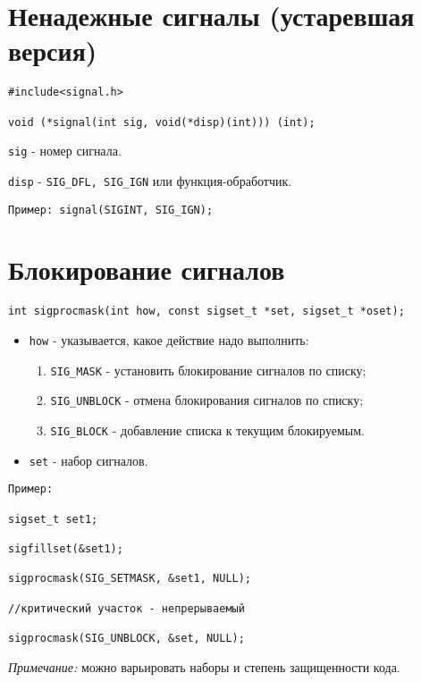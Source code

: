 \section{Ненадежные сигналы (устаревшая версия)}

\begin{verbatim}
#include<signal.h>

void (*signal(int sig, void(*disp)(int))) (int);
\end{verbatim}
\verb+sig+ - номер сигнала.

\verb+disp+ - \verb+SIG_DFL, SIG_IGN+ или функция-обработчик.

\verb+Пример: signal(SIGINT, SIG_IGN);+

\section{Блокирование сигналов}

\verb+int sigprocmask(int how, const sigset_t *set, sigset_t *oset);+
\begin{itemize}
\item \verb+how+ - указывается, какое действие надо выполнить:
	\begin{enumerate}
		\item \verb+SIG_MASK+ - установить блокирование сигналов по списку;
		\item \verb+SIG_UNBLOCK+ - отмена блокирования сигналов по списку;
		\item \verb+SIG_BLOCK+ - добавление списка к текущим блокируемым.
	\end{enumerate}
\item \verb+set+ - набор сигналов.
\end{itemize}

\begin{verbatim}
Пример:

sigset_t set1;

sigfillset(&set1);

sigprocmask(SIG_SETMASK, &set1, NULL);

//критический участок - непрерываемый

sigprocmask(SIG_UNBLOCK, &set, NULL);
\end{verbatim}

\emph{Примечание:} можно варьировать наборы и степень защищенности кода.

